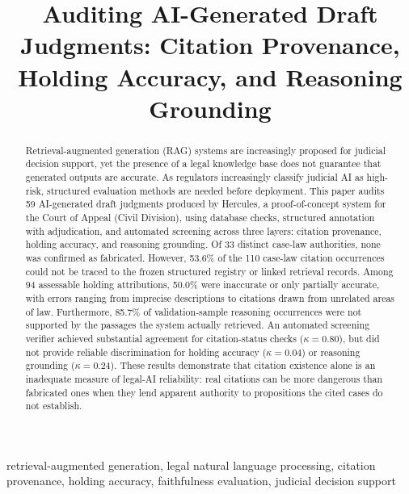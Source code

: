 \documentclass[conference]{IEEEtran}
\begin{document}
\title{Auditing AI-Generated Draft Judgments: Citation Provenance, Holding Accuracy, and Reasoning Grounding}

\author{
}

\maketitle

\begin{abstract}
Retrieval-augmented generation (RAG) systems are increasingly proposed for judicial decision support, yet the presence of a legal knowledge base does not guarantee that generated outputs are accurate. As regulators increasingly classify judicial AI as high-risk, structured evaluation methods are needed before deployment. This paper audits 59 AI-generated draft judgments produced by Hercules, a proof-of-concept system for the Court of Appeal (Civil Division), using database checks, structured annotation with adjudication, and automated screening across three layers: citation provenance, holding accuracy, and reasoning grounding. Of 33 distinct case-law authorities, none was confirmed as fabricated. However, 53.6\% of the 110 case-law citation occurrences could not be traced to the frozen structured registry or linked retrieval records. Among 94 assessable holding attributions, 50.0\% were inaccurate or only partially accurate, with errors ranging from imprecise descriptions to citations drawn from unrelated areas of law. Furthermore, 85.7\% of validation-sample reasoning occurrences were not supported by the passages the system actually retrieved. An automated screening verifier achieved substantial agreement for citation-status checks ($\kappa = 0.80$), but did not provide reliable discrimination for holding accuracy ($\kappa = 0.04$) or reasoning grounding ($\kappa = 0.24$). These results demonstrate that citation existence alone is an inadequate measure of legal-AI reliability: real citations can be more dangerous than fabricated ones when they lend apparent authority to propositions the cited cases do not establish.
\end{abstract}

\begin{IEEEkeywords}
retrieval-augmented generation, legal natural language processing, citation provenance, holding accuracy, faithfulness evaluation, judicial decision support
\end{IEEEkeywords}
\end{document}

